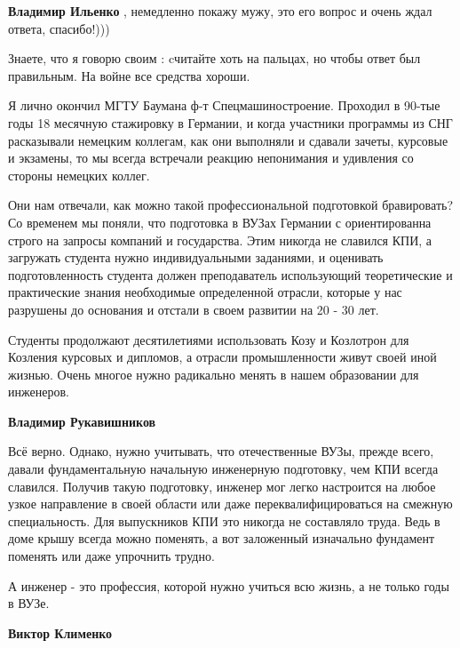 \begin{itemize}
\begin{itemize}
\textbf{Владимир Ильенко} , немедленно покажу мужу, это его вопрос и очень ждал ответа, спасибо!)))
\end{itemize} %

Знаете, что я говорю своим : cчитайте хоть на пальцах, но чтобы ответ был правильным. На войне все средства хороши.


Я лично окончил МГТУ Баумана ф-т Спецмашиностроение. Проходил в 90-тые годы 18
месячную стажировку в Германии, и когда участники программы из СНГ расказывали
немецким коллегам, как они выполняли и сдавали зачеты, курсовые и экзамены, то
мы всегда встречали реакцию непонимания и удивления со стороны немецких коллег.

Они нам отвечали, как можно такой профессиональной подготовкой бравировать? Со
временем мы поняли, что подготовка в ВУЗах Германии с ориентированна строго на
запросы компаний и государства. Этим никогда не славился КПИ, а загружать
студента нужно индивидуальными заданиями, и оценивать подготовленность студента
должен преподаватель использующий теоретические и практические знания
необходимые определенной отрасли, которые у нас разрушены до основания и
отстали в своем развитии на 20 - 30 лет. 

Студенты продолжают десятилетиями использовать Козу и Козлотрон для Козления
курсовых и дипломов, а отрасли промышленности живут своей иной жизнью. Очень
многое нужно радикально менять в нашем образовании для инженеров.

\begin{itemize} %
\textbf{Владимир Рукавишников}

Всё верно. Однако, нужно учитывать, что отечественные ВУЗы, прежде всего,
давали фундаментальную начальную инженерную подготовку, чем КПИ всегда
славился. Получив такую подготовку, инженер мог легко настроится на любое узкое
направление в своей области или даже переквалифицироваться на смежную
специальность. Для выпускников КПИ это никогда не составляло труда. Ведь в доме
крышу всегда можно поменять, а вот заложенный изначально фундамент поменять или
даже упрочнить трудно.

А инженер - это профессия, которой нужно учиться всю жизнь, а не только годы в ВУЗе.

\begin{itemize} %
\textbf{Виктор Клименко} 


\end{itemize}
\end{itemize}
\end{itemize}
